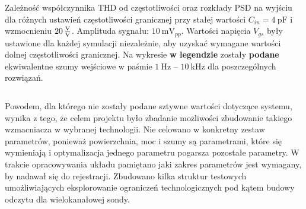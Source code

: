 \begin{frame}[t]
\begin{columns}

        {\renewcommand\normalsize{\small}%
        \normalsize
        Zależność współczynnika THD od częstotliwości oraz rozkłady PSD na wyjściu dla różnych ustawień częstotliwości granicznej przy stałej wartości $C_{in} = \SI{4}{\pico\farad}$ i wzmocnieniu $\SI{20}{\frac{\volt}{\volt}}$.
        Amplituda sygnału: $\SI{10}{\milli\volt_{pp}}$.
        Wartości napięcia $V_{gs} $ były ustawione dla każdej symulacji niezależnie, aby uzyskać wymagane wartości dolnej częstotliwości granicznej.  
        Na wykresie \textbf{w legendzie} zostały \textbf{podane} ekwiwalentne szumy wejściowe w paśmie $\SI{1}{\hertz}$ -- $\SI{10}{\kilo\hertz}$ dla poszczególnych rozwiązań.
        }
    
    \end{columns}
\end{frame}

\begin{frame}[t]
    
\end{frame}

\begin{frame}[t]
    \vspace{-1em}
    \begin{block}{\af}
    \end{block}
    {\renewcommand\normalsize{\small}%
\normalsize
Powodem, dla którego nie zostały podane sztywne wartości dotyczące systemu, wynika z tego, że celem projektu było zbadanie możliwości zbudowanie takiego wzmacniacza w wybranej technologii. Nie celowano w konkretny zestaw parametrów, ponieważ powierzchnia, moc i szumy są parametrami, które się wymieniają i optymalizacja jednego parametru pogarsza pozostałe parametry.
W trakcie opracowywania układu pamiętano jaki zakres parametrów jest wymagany, by nadawał się do rejestracji.
Zbudowano kilka struktur testowych umożliwiających eksplorowanie ograniczeń technologicznych pod kątem budowy odczytu dla wielokanałowej sondy. 

}
    
\end{frame}

